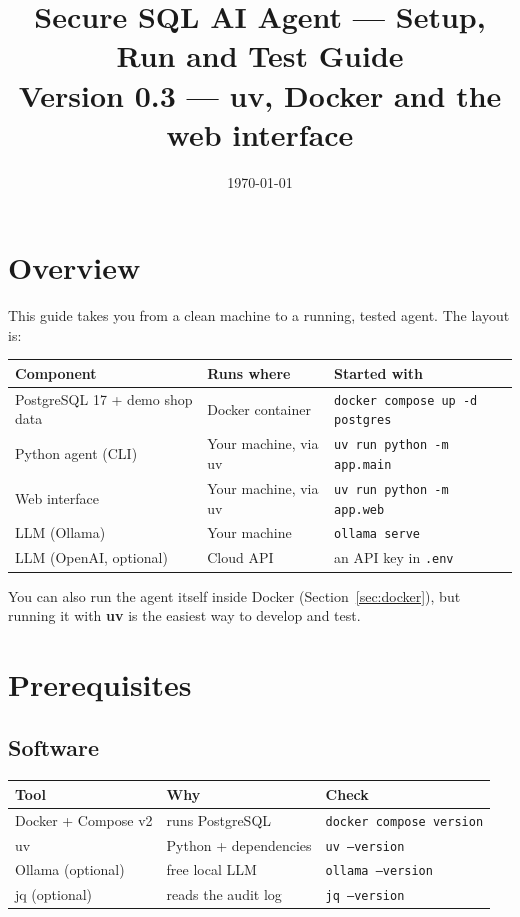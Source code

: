 \documentclass[11pt,a4paper]{article}
\title{\textbf{Secure SQL AI Agent --- Setup, Run and Test Guide}\\[4pt]
       \large Version 0.3 --- uv, Docker and the web interface}
\author{}
\date{\today}
\begin{document}
\sloppy
\maketitle
\tableofcontents
\bigskip

\section*{Overview}

This guide takes you from a clean machine to a running, tested agent.
The layout is:

\begin{center}
\begin{tabular}{@{}lll@{}}
\toprule
\textbf{Component} & \textbf{Runs where} & \textbf{Started with} \\
\midrule
PostgreSQL 17 + demo shop data & Docker container       & \texttt{docker compose up -d postgres} \\
Python agent (CLI)             & Your machine, via uv   & \texttt{uv run python -m app.main} \\
Web interface                  & Your machine, via uv   & \texttt{uv run python -m app.web} \\
LLM (Ollama)                   & Your machine           & \texttt{ollama serve} \\
LLM (OpenAI, optional)         & Cloud API              & an API key in \texttt{.env} \\
\bottomrule
\end{tabular}
\end{center}

You can also run the agent itself inside Docker (Section~\ref{sec:docker}),
but running it with \textbf{uv} is the easiest way to develop and test.

\section{Prerequisites}

\subsection{Software}

\begin{center}
\begin{tabular}{@{}lll@{}}
\toprule
\textbf{Tool} & \textbf{Why} & \textbf{Check} \\
\midrule
Docker + Compose v2 & runs PostgreSQL          & \texttt{docker compose version} \\
uv                  & Python + dependencies    & \texttt{uv --version} \\
Ollama (optional)   & free local LLM           & \texttt{ollama --version} \\
jq (optional)       & reads the audit log      & \texttt{jq --version} \\
\bottomrule
\end{tabular}
\end{center}
\end{document}
